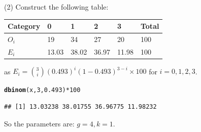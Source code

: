 \documentclass[t,xcolor=pdftex,dvipsnames,table]{beamer}\usepackage[]{graphicx}\usepackage[]{color}
\makeatletter
\newcommand{\hlnum}[1]{\textcolor[rgb]{0.686,0.059,0.569}{#1}}%
\newcommand{\hlopt}[1]{\textcolor[rgb]{0,0,0}{#1}}%
\newcommand{\hlstd}[1]{\textcolor[rgb]{0.345,0.345,0.345}{#1}}%
\newcommand{\hlkwd}[1]{\textcolor[rgb]{0.737,0.353,0.396}{\textbf{#1}}}%
\newenvironment{kframe}{%
 \def\at@end@of@kframe{}%
 \ifinner\ifhmode%
  \def\at@end@of@kframe{\end{minipage}}%
  \begin{minipage}{\columnwidth}%
 \fi\fi%
 \def\FrameCommand##1{\hskip\@totalleftmargin \hskip-\fboxsep
 \colorbox{shadecolor}{##1}\hskip-\fboxsep
     \hskip-\linewidth \hskip-\@totalleftmargin \hskip\columnwidth}%
 \MakeFramed {\advance\hsize-\width
   \@totalleftmargin\z@ \linewidth\hsize
   \@setminipage}}%
 {\par\unskip\endMakeFramed%
 \at@end@of@kframe}
\newenvironment{knitrout}{}{} %
\makeatother
\begin{document}
\begin{frame}[fragile]{}
(2) Construct the following table:

\vspace{.5cm}
\begin{tabular}{l|llll|l} 
Category & 0 & 1 & 2 & 3 & Total  \\ \hline
$O_{i}$ & 19 & 34 & 27 & 20 & 100    \\ \hline
$E_{i}$ & 13.03 & 38.02 & 36.97 & 11.98 & 100    \\ \hline
\end{tabular}

\vspace{.5cm}
as $E_{i} = {3 \choose i} (0.493)^i (1-0.493)^{3-i} \times 100$ for $i=0,1,2,3$. 

\begin{knitrout}
\color{fgcolor}\begin{kframe}
\begin{alltt}
\hlkwd{dbinom}\hlstd{(x,}\hlnum{3}\hlstd{,}\hlnum{0.493}\hlstd{)}\hlopt{*}\hlnum{100}
\end{alltt}
\begin{verbatim}
## [1] 13.03238 38.01755 36.96775 11.98232
\end{verbatim}
\end{kframe}
\end{knitrout}

\vspace{.5cm}
So the parameters are: $g=4, k=1$.
\end{frame} 
\end{document}
